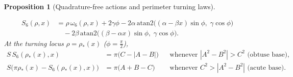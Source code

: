 \documentclass[11pt]{article}
\newtheorem{proposition}[theorem]{Proposition}
\theoremstyle{definition}
\theoremstyle{remark}
\newcommand{\atanTwo}{\mathrm{atan2}}
\renewcommand{\_}{\oldunderscore\penalty0\hskip0pt\relax}
\begin{document}
\begin{proposition}[Quadrature-free actions and perimeter turning laws]
\begin{enumerate}[label=(\alph*),leftmargin=2em,itemsep=3pt]
\begin{equation}
  \begin{split}
  S_6(\rho,x) &= \rho\,\omega_6(\rho,x) + 2\gamma\phi - 2\alpha\,\atanTwo\bigl((\alpha-\beta x)\sin\phi,\;\gamma\cos\phi\bigr)\\
  &\quad - 2\beta\,\atanTwo\bigl((\beta-\alpha x)\sin\phi,\;\gamma\cos\phi\bigr).
  \end{split}
  \label{eq:S6-closed}
\end{equation}
At the turning locus $\rho=\rho_*(x)$ ($\phi=\frac{\pi}{2}$),
\begin{align}
  S\,S_6(\rho_*(x),x) &= \pi\bigl(C-|A-B|\bigr) && \text{whenever } |A^2-B^2|>C^2 \text{ (obtuse base)}, \label{eq:6j-obtuse-law}\\
  S\bigl(\pi\rho_*(x)-S_6(\rho_*(x),x)\bigr) &= \pi\bigl(A+B-C\bigr) && \text{whenever } C^2>|A^2-B^2| \text{ (acute base)}. \label{eq:6j-acute-law}
\end{align}
\end{enumerate}
\end{proposition}
\end{document}
